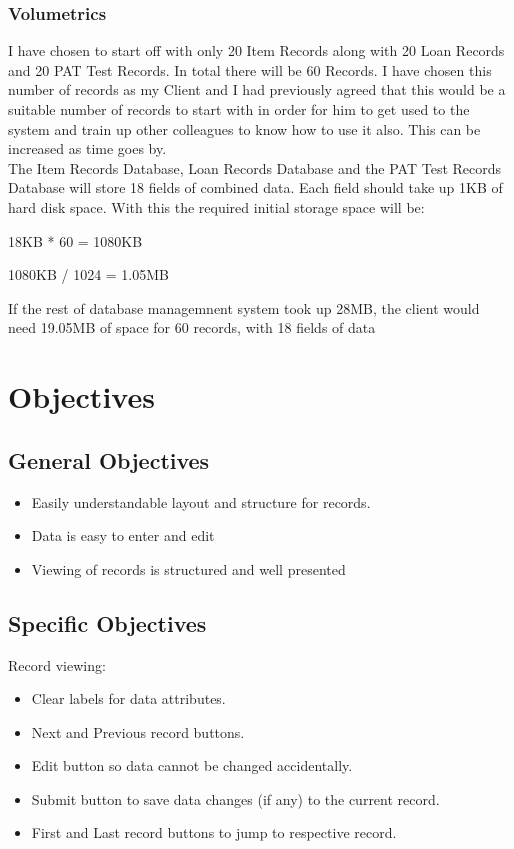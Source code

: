 \newpage

\subsubsection{Volumetrics}

I have chosen to start off with only 20 Item Records along with 20 Loan Records and 20 PAT Test Records. In total there will be 60 Records.  I have chosen this number of records as my Client and I had previously agreed that this would be a suitable number of records to start with in order for him to get used to the system and train up other colleagues to know how to use it also. This can be increased as time goes by.\\

\noindent The Item Records Database, Loan Records Database and the PAT Test Records Database will store 18 fields of combined data. Each field should take up 1KB of hard disk space. With this the required initial storage space will be:

18KB * 60 = 1080KB

1080KB / 1024 = 1.05MB

If the rest of database managemnent system took up 28MB, the client would need 19.05MB of space for 60 records, with 18 fields of data

\section{Objectives}

\subsection{General Objectives}

\begin{itemize}
	\item Easily understandable layout and structure for records.
	\item Data is easy to enter and edit
	\item Viewing of records is structured and well presented
\end{itemize}

\subsection{Specific Objectives}

Record viewing:
\begin{itemize}
    \item Clear labels for data attributes.
    \item Next and Previous record buttons.
    \item Edit button so data cannot be changed accidentally.
    \item Submit button to save data changes (if any) to the current record.
    \item First and Last record buttons to jump to respective record.
\end{itemize}

